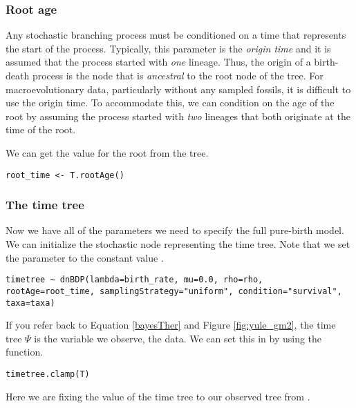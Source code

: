 \subsubsection{Root age}

Any stochastic branching process must be conditioned on a time that represents the start of the process.
Typically, this parameter is the \textit{origin time} and it is assumed that the process started with \textit{one} lineage.
Thus, the origin of a birth-death process is the node that is \textit{ancestral} to the root node of the tree.
For macroevolutionary data, particularly without any sampled fossils, it is difficult to use the origin time.
To accommodate this, we can condition on the age of the root by assuming the process started with \textit{two} lineages that both originate at the time of the root.

We can get the value for the root from the \citet{MagnusonFord2012} tree.

{\tt \begin{snugshade*}
\begin{lstlisting}
root_time <- T.rootAge()
\end{lstlisting}
\end{snugshade*}}

\subsubsection{The time tree}

Now we have all of the parameters we need to specify the full pure-birth model.
We can initialize the stochastic node representing the time tree.
Note that we set the  parameter to the constant value .
{\tt \begin{snugshade*}
\begin{lstlisting}
timetree ~ dnBDP(lambda=birth_rate, mu=0.0, rho=rho, rootAge=root_time, samplingStrategy="uniform", condition="survival", taxa=taxa)
\end{lstlisting}
\end{snugshade*}}

If you refer back to Equation \ref{bayesTher} and Figure \ref{fig:yule_gm2}, the time tree $\Psi$ is the variable we observe, \IE the data.
We can set this in \Rev by using the  function.
{\tt \begin{snugshade*}
\begin{lstlisting}
timetree.clamp(T)
\end{lstlisting}
\end{snugshade*}}
Here we are fixing the value of the time tree to our observed tree from \citet{MagnusonFord2012}.

